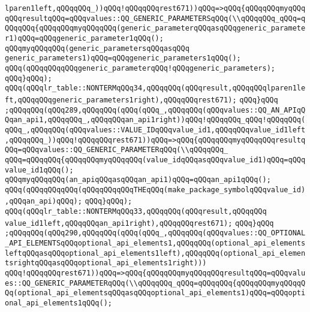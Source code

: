 \verb|lparen1left,qQQqqQQq_))qQQq!qQQqqQQqrest671))qQQq=>qQQq{qQQqqQQqmyqQQqqQQqresultqQQq=qQQqvalues::QQ_GENERIC_PARAMETERSqQQq(\\qQQqqQQq_qQQq=qQQqqQQq{qQQqqQQqmyqQQqqQQq(generic_parameterqQQqasqQQqgeneric_parameter1)qQQq=qQQqgeneric_parameter1qQQq();|\newline
\verb|qQQqmyqQQqqQQq(generic_parametersqQQqasqQQq|\newline
\verb|generic_parameters1)qQQq=qQQqgeneric_parameters1qQQq();|\newline
\verb|qQQq(qQQqqQQqqQQqgeneric_parameterqQQq!qQQqgeneric_parameters);|\newline
\verb|qQQq}qQQq);|\newline
\verb|qQQq(qQQqlr_table::NONTERMqQQq34,qQQqqQQq(qQQqresult,qQQqqQQqlparen1left,qQQqqQQqgeneric_parameters1right),qQQqqQQqrest671);|\newline
\verb|qQQq}qQQq|\newline
\verb|;qQQqqQQq(qQQq289,qQQqqQQq(qQQq(qQQq_,qQQqqQQq(qQQqvalues::QQ_AN_APIqQQqan_api1,qQQqqQQq_,qQQqqQQqan_api1right))qQQq!qQQqqQQq_qQQq!qQQqqQQq(qQQq_,qQQqqQQq(qQQqvalues::VALUE_IDqQQqvalue_id1,qQQqqQQqvalue_id1left,qQQqqQQq_))qQQq!qQQqqQQqrest671))qQQq=>qQQq{qQQqqQQqmyqQQqqQQqresultqQQq=qQQqvalues::QQ_GENERIC_PARAMETERqQQq(\\qQQqqQQq_|\newline
\verb|qQQq=qQQqqQQq{qQQqqQQqmyqQQqqQQq(value_idqQQqasqQQqvalue_id1)qQQq=qQQqvalue_id1qQQq();|\newline
\verb|qQQqmyqQQqqQQq(an_apiqQQqasqQQqan_api1)qQQq=qQQqan_api1qQQq();|\newline
\verb|qQQq(qQQqqQQqqQQq(qQQqqQQqqQQqTHEqQQq(make_package_symbolqQQqvalue_id),qQQqan_api)qQQq);|\newline
\verb|qQQq}qQQq);|\newline
\verb|qQQq(qQQqlr_table::NONTERMqQQq33,qQQqqQQq(qQQqresult,qQQqqQQq|\newline
\verb|value_id1left,qQQqqQQqan_api1right),qQQqqQQqrest671);|\newline
\verb|qQQq}qQQq|\newline
\verb|;qQQqqQQq(qQQq290,qQQqqQQq(qQQq(qQQq_,qQQqqQQq(qQQqvalues::QQ_OPTIONAL_API_ELEMENTSqQQqoptional_api_elements1,qQQqqQQq(optional_api_elementsleftqQQqasqQQqoptional_api_elements1left),qQQqqQQq(optional_api_elementsrightqQQqasqQQqoptional_api_elements1right)))|\newline
\verb|qQQq!qQQqqQQqrest671))qQQq=>qQQq{qQQqqQQqmyqQQqqQQqresultqQQq=qQQqvalues::QQ_GENERIC_PARAMETERqQQq(\\qQQqqQQq_qQQq=qQQqqQQq{qQQqqQQqmyqQQqqQQq(optional_api_elementsqQQqasqQQqoptional_api_elements1)qQQq=qQQqoptional_api_elements1qQQq();|\newline
